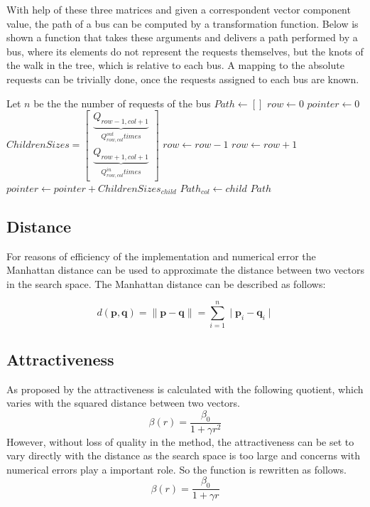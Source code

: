 \documentclass[tuberlin,cic,tc,openright,english,noabntcite,oneside]{iiufrgs}
\begin{document}
With help of these three matrices and given a correspondent vector component value, the path of a bus can be computed by a transformation function. Below is shown a function that takes these arguments and delivers a path performed by a bus, where its elements do not represent the requests themselves, but the knots of the walk in the tree, which is relative to each bus. A mapping to the absolute requests can be trivially done, once the requests assigned to each bus are known.

\begin{algorithmic}
\State Let $n$ be the the number of requests of the bus
\State $Path \gets [ ]$
\State $row \gets 0$
\State $pointer \gets 0$
	\State $\displaystyle ChildrenSizes = \begin{bmatrix}\underbrace{Q_{row-1,col+1}}_{Q^{out}_{row,col} times}
			\\ \underbrace{Q_{row+1,col+1}}_{Q^{in}_{row,col} times}\end{bmatrix}$
				\State $row \gets row - 1$
			\Else
				\State $row \gets row + 1$
			\EndIf
		\Else
			\State $pointer \gets pointer + ChildrenSizes_{child}$
		\EndIf
	\EndFor
	\State $Path_{col} \gets child$
\EndFor
\State \Return $Path$
\EndFunction
\end{algorithmic}

\subsection{Distance}
For reasons of efficiency of the implementation and numerical error the Manhattan distance can be used to approximate the distance between two vectors in the search space. The Manhattan distance can be described as follows:

$$d(\mathbf{p},\mathbf{q}) = \parallel \mathbf{p} - \mathbf{q} \parallel = \sum_{i=1}^{n} \mid \mathbf{p}_{i}-\mathbf{q}_{i} \mid$$

\subsection{Attractiveness}
As proposed by \textcite[p. 173]{yang_firefly_2009} the attractiveness is calculated with the following quotient, which varies with the squared distance between two vectors.
$$\beta(r) = \frac{\beta_{0}}{1 + \gamma r^2}$$
However, without loss of quality in the method, the attractiveness can be set to vary directly with the distance as the search space is too large and concerns with numerical errors play a important role. So the function is rewritten as follows.
$$\beta(r) = \frac{\beta_{0}}{1 + \gamma r}$$
\end{document}
